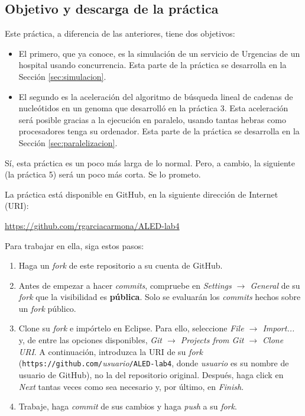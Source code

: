\documentclass[10pt,a4paper,spanish]{article}
\begin{document}
\subsection{Objetivo y descarga de la práctica}

Este práctica, a diferencia de las anteriores, tiene dos objetivos:

\begin{itemize}
    \item El primero, que ya conoce, es la simulación de un servicio de Urgencias de un hospital usando concurrencia. Esta parte de la práctica se desarrolla en la Sección \ref{sec:simulacion}.
    \item El segundo es la aceleración del algoritmo de búsqueda lineal de cadenas de nucleótidos en un genoma que desarrolló en la práctica 3. Esta aceleración será posible gracias a la ejecución en paralelo, usando tantas hebras como procesadores tenga su ordenador. Esta parte de la práctica se desarrolla en la Sección \ref{sec:paralelizacion}.
\end{itemize}

Sí, esta práctica es un poco más larga de lo normal. Pero, a cambio, la siguiente (la práctica 5) será un poco más corta. Se lo prometo.

La práctica está disponible en GitHub, en la siguiente dirección de Internet (URI):

\href{https://github.com/rgarciacarmona/ALED-lab4}{https://github.com/rgarciacarmona/ALED-lab4}

Para trabajar en ella, siga estos pasos:

\begin{enumerate}
    \item Haga un \textit{fork} de este repositorio a su cuenta de GitHub.
    \item Antes de empezar a hacer \textit{commits}, compruebe en \textit{Settings $\to$ General} de su \textit{fork} que la visibilidad es \textbf{pública}. Solo se evaluarán los \textit{commits} hechos sobre un \textit{fork} público.
    \item Clone su \textit{fork} e impórtelo en Eclipse. Para ello, seleccione \textit{File $\to$ Import...} y, de entre las opciones disponibles, \textit{Git $\to$ Projects from Git $\to$ Clone URI}. A continuación, introduzca la URI de su \textit{fork} (\texttt{https://github.com/}\textit{usuario}\texttt{/ALED-lab4}, donde \textit{usuario} es su nombre de usuario de GitHub), no la del repositorio original. Después, haga click en \textit{Next} tantas veces como sea necesario y, por último, en \textit{Finish}.
    \item Trabaje, haga \textit{commit} de sus cambios y haga \textit{push} a su \textit{fork}.
\end{enumerate}
\end{document}
